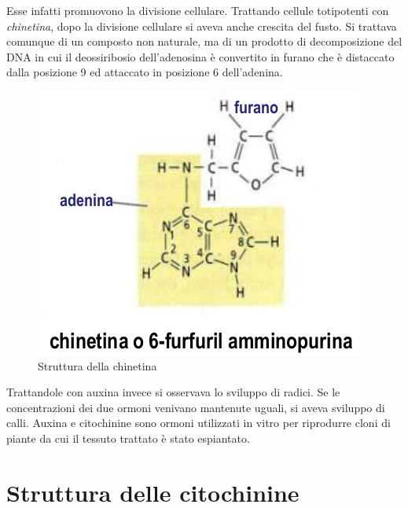 \documentclass[a4paper,12pt]{book}
\begin{document}
Esse infatti promuovono la divisione cellulare. Trattando cellule totipotenti con \emph{chinetina}, dopo la divisione cellulare si aveva anche crescita del fusto. Si trattava comunque di un composto non naturale, ma di un
prodotto di decomposizione del DNA in cui il deossiribosio
dell’adenosina è convertito in furano che è distaccato dalla posizione
9 ed attaccato in posizione 6 dell’adenina.
\begin{figure}[H]
\centering
\includegraphics[scale=0.4]{immagini/chinetina.jpg}
\caption{Struttura della chinetina}
\end{figure}

Trattandole con auxina invece si osservava lo sviluppo di radici. Se le concentrazioni dei due ormoni venivano mantenute uguali, si aveva sviluppo di calli. Auxina e citochinine sono ormoni utilizzati in vitro per riprodurre cloni di piante da cui il tessuto trattato è stato espiantato.
    
\section{Struttura delle citochinine}
\end{document}
